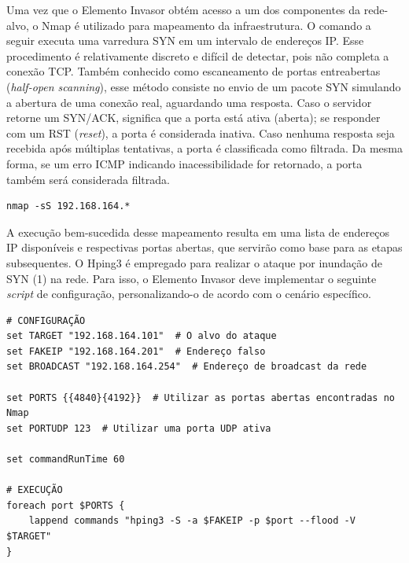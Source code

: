         Uma vez que o Elemento Invasor obtém acesso a um dos componentes da rede-alvo, o Nmap é utilizado para mapeamento da infraestrutura. O comando a seguir executa uma varredura SYN em um intervalo de endereços IP. Esse procedimento é relativamente discreto e difícil de detectar, pois não completa a conexão TCP. Também conhecido como escaneamento de portas entreabertas (\textit{half-open scanning}), esse método consiste no envio de um pacote SYN simulando a abertura de uma conexão real, aguardando uma resposta. Caso o servidor retorne um SYN/ACK, significa que a porta está ativa (aberta); se responder com um RST (\textit{reset}), a porta é considerada inativa. Caso nenhuma resposta seja recebida após múltiplas tentativas, a porta é classificada como filtrada. Da mesma forma, se um erro ICMP indicando inacessibilidade for retornado, a porta também será considerada filtrada.

        \begin{verbatim}
nmap -sS 192.168.164.*
        \end{verbatim}

        A execução bem-sucedida desse mapeamento resulta em uma lista de endereços IP disponíveis e respectivas portas abertas, que servirão como base para as etapas subsequentes. O Hping3 é empregado para realizar o ataque por inundação de SYN (1) na rede. Para isso, o Elemento Invasor deve implementar o seguinte \textit{script} de configuração, personalizando-o de acordo com o cenário específico.


        \begin{verbatim}
# CONFIGURAÇÃO
set TARGET "192.168.164.101"  # O alvo do ataque
set FAKEIP "192.168.164.201"  # Endereço falso
set BROADCAST "192.168.164.254"  # Endereço de broadcast da rede

set PORTS {{4840}{4192}}  # Utilizar as portas abertas encontradas no Nmap
set PORTUDP 123  # Utilizar uma porta UDP ativa

set commandRunTime 60

# EXECUÇÃO
foreach port $PORTS {
    lappend commands "hping3 -S -a $FAKEIP -p $port --flood -V $TARGET"
}
        \end{verbatim}

